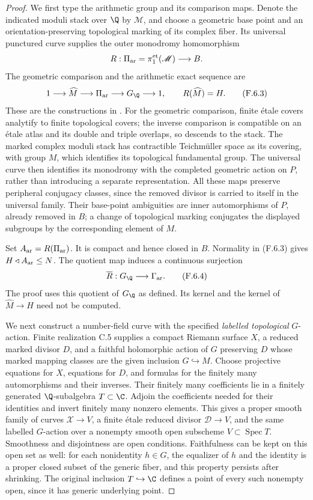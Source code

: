 \begin{proof}
We first type the arithmetic group and its comparison maps.
Denote the indicated moduli stack over $\Q$ by $\mathscr M$,
and choose a geometric base point and an orientation-preserving
topological marking of its complex fiber.  Its universal
punctured curve supplies the outer monodromy homomorphism
\[
 R:\Pi_{\rm ar}=\pi_1^{\rm et}(\mathscr M)
           \longrightarrow B.
\]
The geometric comparison and the arithmetic exact sequence are
\[
 1\longrightarrow\widehat M
  \longrightarrow\Pi_{\rm ar}
  \longrightarrow G_{\Q}\longrightarrow1,
 \qquad R(\widehat M)=H.                               \tag{F.6.3}
\]
These are the constructions in \cite[\S\S7.1--7.2,
equation (29) and the universal \'etale monodromy
representation]{R-BoggiAut2026}.  For the geometric comparison,
finite \'etale covers analytify to finite topological covers;
the inverse comparison is compatible on an \'etale atlas and
its double and triple overlaps, so descends to the stack.
The marked complex moduli stack has contractible Teichm\"uller
space as its covering, with group $M$, which identifies its
topological fundamental group.  The universal curve then
identifies its monodromy with the completed geometric action
on $P$, rather than introducing a separate representation.
All these maps preserve peripheral conjugacy classes, since
the removed divisor is carried to itself in the universal
family.  Their base-point ambiguities are inner automorphisms
of $P$, already removed in $B$; a change of topological marking
conjugates the displayed subgroups by the corresponding element
of $M$.

Set $A_{\rm ar}=R(\Pi_{\rm ar})$.  It is compact and hence
closed in $B$.  Normality in (F.6.3) gives
$H\triangleleft A_{\rm ar}\leq N$.  The quotient map induces
a continuous surjection
\[
 \overline R:G_{\Q}\longrightarrow\Gamma_{\rm ar}.     \tag{F.6.4}
\]
The proof uses this quotient of $G_{\Q}$ as defined.  Its kernel
and the kernel of $\widehat M\to H$ need not be computed.

We next construct a number-field curve with the specified
\emph{labelled topological} $G$-action.  Finite realization
C.5 supplies a compact Riemann surface $X$, a reduced marked
divisor $D$, and a faithful holomorphic action of $G$ preserving
$D$ whose marked mapping classes are the given inclusion
$G\hookrightarrow M$.  Choose projective equations for $X$,
equations for $D$, and formulas for the finitely many
automorphisms and their inverses.  Their finitely many
coefficients lie in a finitely generated $\Q$-subalgebra
$T\subset\C$.  Adjoin the coefficients needed for their
identities and invert finitely many nonzero elements.  This
gives a proper smooth family of curves $\mathcal X\to V$,
a finite \'etale reduced divisor $\mathcal D\to V$, and
the same labelled $G$-action over a nonempty smooth open
subscheme $V\subset\operatorname{Spec}T$.  Smoothness and
disjointness are open conditions.  Faithfulness can be kept
on this open set as well: for each nonidentity $h\in G$,
the equalizer of $h$ and the identity is a proper closed
subset of the generic fiber, and this property persists
after shrinking.  The original inclusion $T\hookrightarrow\C$
defines a point of every such nonempty open, since it has
generic underlying point.


\end{proof}
